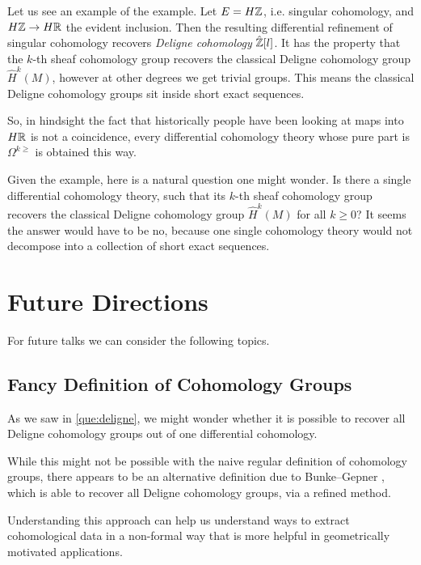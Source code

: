 \documentclass[10pt]{amsart}
\begin{document}
\begin{example}
 Let us see an example of the example. Let $E = H\mathbb{Z}$, i.e. singular cohomology, and $H\mathbb{Z} \to H\mathbb{R}$ the evident inclusion. Then the resulting differential refinement of singular cohomology recovers \emph{Deligne cohomology} $\hat{\mathbb{Z}}[l]$. It has the property that the $k$-th sheaf cohomology group recovers the classical Deligne cohomology group $\hat{H}^k(M)$, however at other degrees we get trivial groups. This means the classical Deligne cohomology groups sit inside short exact sequences.
\end{example}

So, in hindsight the fact that historically people have been looking at maps into $H\mathbb{R}$ is not a coincidence, every differential cohomology theory whose pure part is $\Omega^{k \geq}$ is obtained this way.

\begin{question} \label{que:deligne}
 Given the example, here is a natural question one might wonder. Is there a single differential cohomology theory, such that its $k$-th sheaf cohomology group recovers the classical Deligne cohomology group $\hat{H}^k(M)$ for all $k \geq 0$? It seems the answer would have to be no, because one single cohomology theory would not decompose into a collection of short exact sequences.
\end{question}


\section{Future Directions}
For future talks we can consider the following topics.

\subsection{Fancy Definition of Cohomology Groups}

As we saw in \cref{que:deligne}, we might wonder whether it is possible to recover all Deligne cohomology groups out of one differential cohomology. 

While this might not be possible with the naive regular definition of cohomology groups, there appears to be an alternative definition due to Bunke--Gepner \cite{bunkegepner2021diffktheory}, which is able to recover all Deligne cohomology groups, via a refined method.

Understanding this approach can help us understand ways to extract cohomological data in a non-formal way that is more helpful in geometrically motivated applications.
\end{document}
